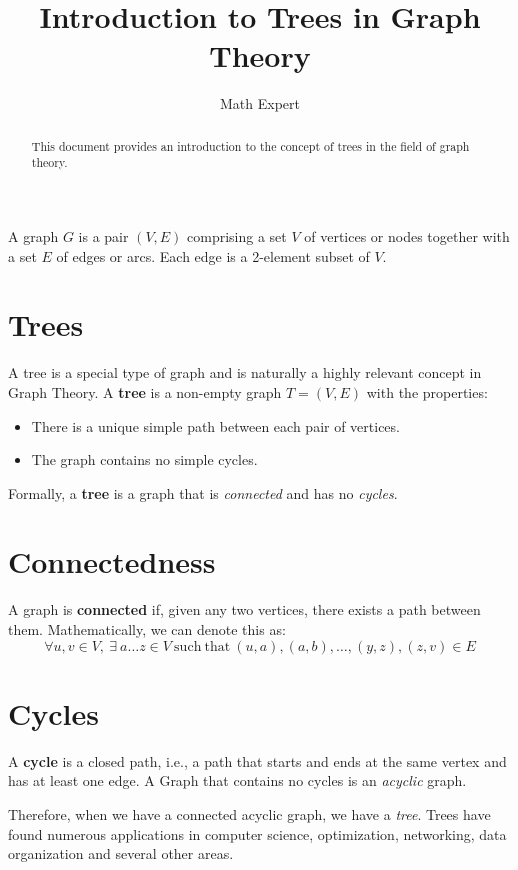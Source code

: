 \documentclass{article}
\begin{document}
\title{Introduction to Trees in Graph Theory}
\author{Math Expert}
\maketitle

\begin{abstract}
This document provides an introduction to the concept of trees in the field of graph theory.
\end{abstract}

A graph $G$ is a pair $(V,E)$ comprising a set $V$ of vertices or nodes together with a set $E$ of edges or arcs. Each edge is a 2-element subset of $V$. 

\section{Trees}

A tree is a special type of graph and is naturally a highly relevant concept in Graph Theory. A \textbf{tree} is a non-empty graph $T = (V, E)$ with the properties:
\begin{itemize}
\item There is a unique simple path between each pair of vertices.
\item The graph contains no simple cycles. %
\end{itemize}

Formally, a \textbf{tree} is a graph that is \textit{connected} and has no \textit{cycles}.

\section{Connectedness}

A graph is \textbf{connected} if, given any two vertices, there exists a path between them. Mathematically, we can denote this as: \\ 

\[
\forall u,v \in V,\: \exists \:a\ldots z \in V \:\mathrm{such\:that\:} (u,a),(a,b),\dots,(y,z),(z,v) \in E
\]

\section{Cycles}

A \textbf{cycle} is a closed path, i.e., a path that starts and ends at the same vertex and has at least one edge. A Graph that contains no cycles is an \textit{acyclic} graph.

Therefore, when we have a connected acyclic graph, we have a \textit{tree}. Trees have found numerous applications in computer science, optimization, networking, data organization and several other areas. 
\end{document}
